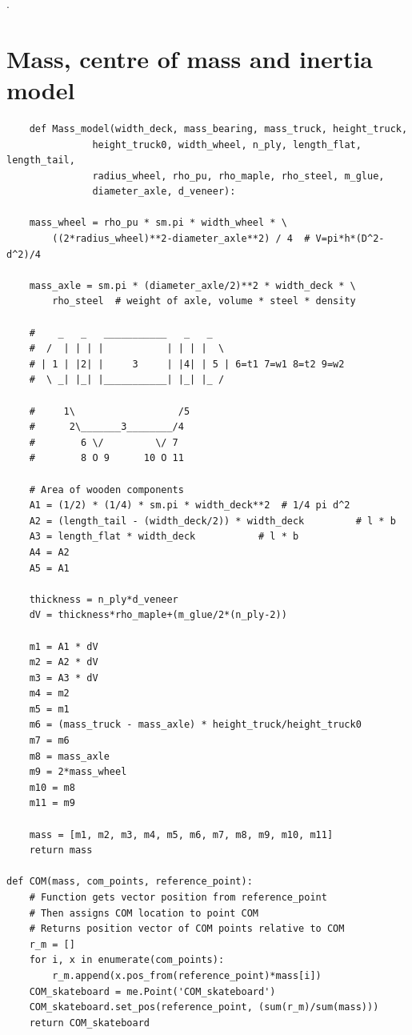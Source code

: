 \newpage
.
\newpage
\section*{Mass, centre of mass and inertia model}
\begin{verbatim}
    def Mass_model(width_deck, mass_bearing, mass_truck, height_truck, 
               height_truck0, width_wheel, n_ply, length_flat, length_tail, 
               radius_wheel, rho_pu, rho_maple, rho_steel, m_glue, 
               diameter_axle, d_veneer):

    mass_wheel = rho_pu * sm.pi * width_wheel * \
        ((2*radius_wheel)**2-diameter_axle**2) / 4  # V=pi*h*(D^2-d^2)/4

    mass_axle = sm.pi * (diameter_axle/2)**2 * width_deck * \
        rho_steel  # weight of axle, volume * steel * density

    #    _   _   ___________   _   _
    #  /  | | | |           | | | |  \
    # | 1 | |2| |     3     | |4| | 5 | 6=t1 7=w1 8=t2 9=w2
    #  \ _| |_| |___________| |_| |_ /

    #     1\                  /5
    #      2\_______3________/4
    #        6 \/         \/ 7
    #        8 O 9      10 O 11
    
    # Area of wooden components
    A1 = (1/2) * (1/4) * sm.pi * width_deck**2  # 1/4 pi d^2
    A2 = (length_tail - (width_deck/2)) * width_deck         # l * b
    A3 = length_flat * width_deck           # l * b
    A4 = A2
    A5 = A1
    
    thickness = n_ply*d_veneer
    dV = thickness*rho_maple+(m_glue/2*(n_ply-2))

    m1 = A1 * dV
    m2 = A2 * dV
    m3 = A3 * dV
    m4 = m2
    m5 = m1
    m6 = (mass_truck - mass_axle) * height_truck/height_truck0
    m7 = m6
    m8 = mass_axle
    m9 = 2*mass_wheel
    m10 = m8
    m11 = m9

    mass = [m1, m2, m3, m4, m5, m6, m7, m8, m9, m10, m11]
    return mass

def COM(mass, com_points, reference_point):
    # Function gets vector position from reference_point
    # Then assigns COM location to point COM
    # Returns position vector of COM points relative to COM
    r_m = []
    for i, x in enumerate(com_points):
        r_m.append(x.pos_from(reference_point)*mass[i])
    COM_skateboard = me.Point('COM_skateboard')
    COM_skateboard.set_pos(reference_point, (sum(r_m)/sum(mass)))
    return COM_skateboard
\end{verbatim}
\newpage
